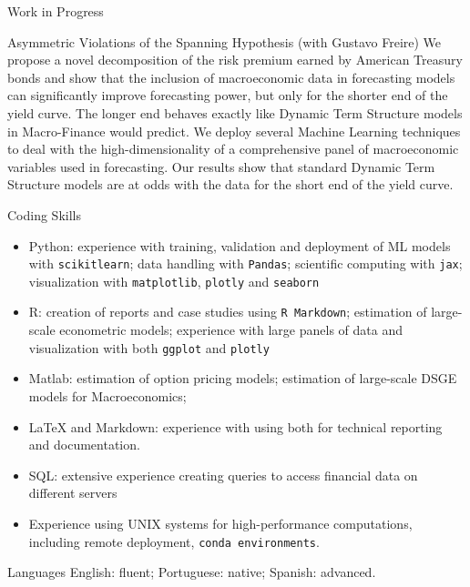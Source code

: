 \documentclass{resume} %
\begin{document}
\begin{rSection}{Work in Progress}
\begin{rSubsection}{Asymmetric Violations of the Spanning Hypothesis }{}{(with Gustavo Freire)}{}
We propose a novel decomposition of the risk premium earned by American Treasury bonds and show that the inclusion of macroeconomic data in forecasting models can significantly improve forecasting power, but only for the shorter end of the yield curve. The longer end behaves exactly like Dynamic Term Structure models in Macro-Finance would predict. We deploy several Machine Learning techniques to deal with the high-dimensionality of a comprehensive panel of macroeconomic variables used in forecasting. Our results show that standard Dynamic Term Structure models are at odds with the data for the short end of the yield curve.
\end{rSubsection}
	
\end{rSection}

\begin{rSection}{Coding Skills}
\begin{itemize}
	\item Python: experience with training, validation and deployment of ML models with \texttt{scikitlearn}; data handling with \texttt{Pandas}; scientific computing with \texttt{jax}; visualization with \texttt{matplotlib}, \texttt{plotly} and \texttt{seaborn}
	\item R: creation of reports and case studies using \texttt{R Markdown}; estimation of large-scale econometric models; experience with large panels of data and visualization with both \texttt{ggplot} and \texttt{plotly}
	\item Matlab: estimation of option pricing models; estimation of large-scale DSGE models for Macroeconomics;
	\item LaTeX and Markdown: experience with using both for technical reporting and documentation.
	\item SQL: extensive experience creating queries to access financial data on different servers
	\item Experience using UNIX systems for high-performance computations, including remote deployment, \texttt{conda environments}.
\end{itemize}

\end{rSection}

\begin{rSection}{Languages}
English: fluent; Portuguese: native; Spanish: advanced.
	
\end{rSection}
\end{document}
